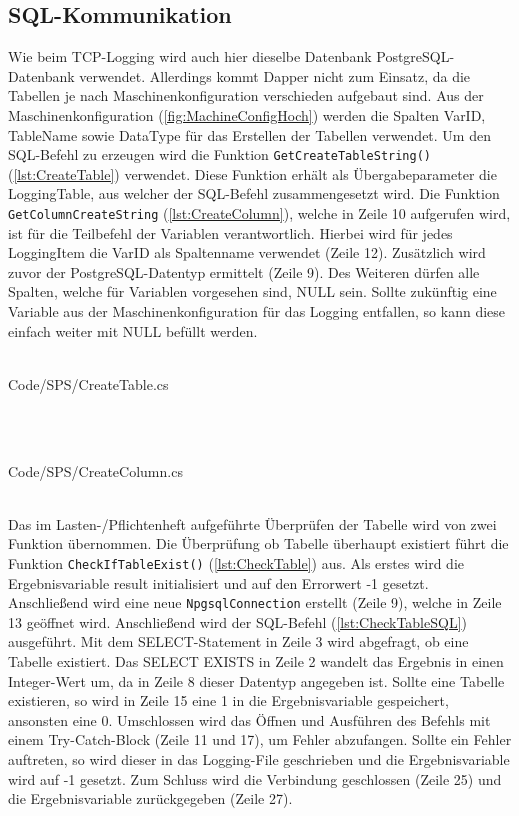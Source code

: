 \subsection{SQL-Kommunikation}
Wie beim TCP-Logging wird auch hier dieselbe Datenbank PostgreSQL-Datenbank  verwendet. Allerdings kommt Dapper nicht zum Einsatz, da die Tabellen je nach Maschinenkonfiguration verschieden aufgebaut sind. Aus der Maschinenkonfiguration (\autoref{fig:MachineConfigHoch}) werden die Spalten \glqq VarID\grqq{}, \glqq TableName\grqq{} sowie \glqq DataType\grqq{} für das Erstellen der Tabellen verwendet. Um den SQL-Befehl zu erzeugen wird die Funktion \texttt{GetCreateTable\-String()} (\autoref{lst:CreateTable}) verwendet. Diese Funktion erhält als Übergabeparameter die LoggingTable, aus welcher der SQL-Befehl zusammengesetzt wird. Die Funktion \texttt{Get\-ColumnCreateString} (\autoref{lst:CreateColumn}), welche in Zeile 10 aufgerufen wird, ist für die Teilbefehl der Variablen verantwortlich. Hierbei wird für jedes LoggingItem die \glqq VarID\grqq{} als Spaltenname verwendet (Zeile 12). Zusätzlich wird zuvor der PostgreSQL-Datentyp ermittelt (Zeile 9). Des Weiteren dürfen alle Spalten, welche für Variablen vorgesehen sind, NULL sein. Sollte zukünftig eine Variable aus der Maschinenkonfiguration für das Logging entfallen, so kann diese einfach weiter mit NULL befüllt werden.
\ \\
\begin{minipage}{\textwidth}
\ \\
 {Code/SPS/CreateTable.cs}
\ \\
\end{minipage}
\ \\
\begin{minipage}{\textwidth}
\ \\
 {Code/SPS/CreateColumn.cs}
\ \\
\end{minipage}
\ \\ 
Das im Lasten-/Pflichtenheft aufgeführte Überprüfen der Tabelle wird von zwei Funktion übernommen. Die Überprüfung ob Tabelle überhaupt existiert führt die Funktion \texttt{CheckIfTableExist()} (\autoref{lst:CheckTable}) aus. Als erstes wird die Ergebnisvariable \glqq result\grqq{} initialisiert und auf den Errorwert -1 gesetzt. Anschließend wird eine neue \texttt{Npgsql\-Connection} erstellt (Zeile 9), welche in Zeile 13 geöffnet wird. Anschließend wird der SQL-Befehl (\autoref{lst:CheckTableSQL}) ausgeführt. Mit dem SELECT-Statement in Zeile 3 wird abgefragt, ob eine Tabelle existiert. Das SELECT EXISTS in Zeile 2 wandelt das Ergebnis in einen Integer-Wert um, da in Zeile 8 dieser Datentyp angegeben ist. Sollte eine Tabelle existieren, so wird in Zeile 15 eine 1 in die Ergebnisvariable gespeichert, ansonsten eine 0. Umschlossen wird das Öffnen und Ausführen des Befehls mit einem Try-Catch-Block (Zeile 11 und 17), um Fehler abzufangen. Sollte ein Fehler auftreten, so wird dieser in das Logging-File geschrieben und die Ergebnisvariable wird auf -1 gesetzt. Zum Schluss wird die Verbindung geschlossen (Zeile 25) und die Ergebnisvariable zurückgegeben (Zeile 27). 
